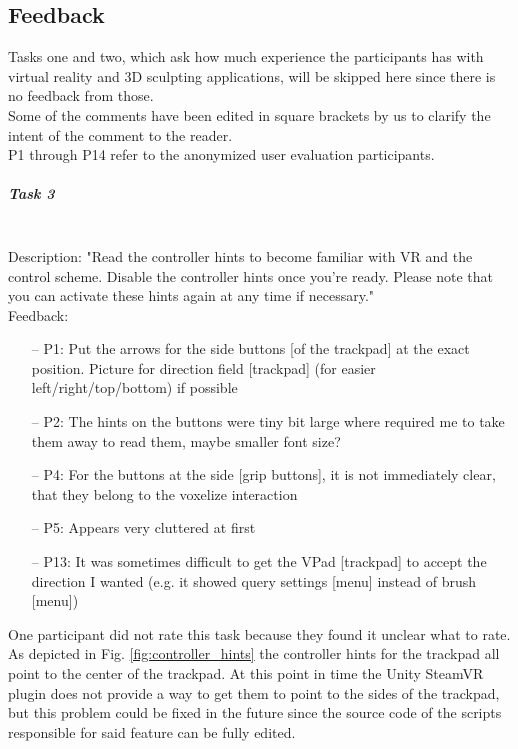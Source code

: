 \subsection{Feedback}
\label{sec:feedback}

Tasks one and two, which ask how much experience the participants has with virtual reality and 3D sculpting applications, will be skipped here since there is no feedback from those.\\
Some of the comments have been edited in square brackets by us to clarify the intent of the comment to the reader.\\
P1 through P14 refer to the anonymized user evaluation participants.

\subparagraph{Task 3} \hfill \\
Description: "Read the controller hints to become familiar with VR and the control scheme. Disable the controller hints once you're ready. Please note that you can activate these hints
again at any time if necessary."\\
Feedback:
\begin{itemize} \setlength\itemsep{-0.5em}
	\item[--] P1: Put the arrows for the side buttons [of the trackpad] at the exact position. Picture for direction field [trackpad] (for easier left/right/top/bottom) if possible
	\item[--] P2: The hints on the buttons were tiny bit large where required me to take them away to read them, maybe smaller font size?
	\item[--] P4: For the buttons at the side [grip buttons], it is not immediately clear, that they belong to the voxelize interaction
	\item[--] P5: Appears very cluttered at first
	\item[--] P13: It was sometimes difficult to get the VPad [trackpad] to accept the direction I wanted (e.g. it showed query settings [menu] instead of brush [menu])
\end{itemize}
One participant did not rate this task because they found it unclear what to rate.\\
As depicted in Fig. \ref{fig:controller_hints} the controller hints for the trackpad all point to the center of the trackpad. At this point in time the Unity SteamVR plugin does not provide a way to get them to point to the sides of the trackpad, but this problem could be fixed in the future since the source code of the scripts responsible for said feature can be fully edited.

